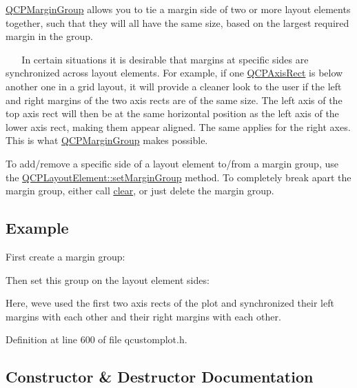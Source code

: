 \hyperlink{class_q_c_p_margin_group}{Q\+C\+P\+Margin\+Group} allows you to tie a margin side of two or more layout elements together, such that they will all have the same size, based on the largest required margin in the group.

~\newline
~\newline
 In certain situations it is desirable that margins at specific sides are synchronized across layout elements. For example, if one \hyperlink{class_q_c_p_axis_rect}{Q\+C\+P\+Axis\+Rect} is below another one in a grid layout, it will provide a cleaner look to the user if the left and right margins of the two axis rects are of the same size. The left axis of the top axis rect will then be at the same horizontal position as the left axis of the lower axis rect, making them appear aligned. The same applies for the right axes. This is what \hyperlink{class_q_c_p_margin_group}{Q\+C\+P\+Margin\+Group} makes possible.

To add/remove a specific side of a layout element to/from a margin group, use the \hyperlink{class_q_c_p_layout_element_a516e56f76b6bc100e8e71d329866847d}{Q\+C\+P\+Layout\+Element\+::set\+Margin\+Group} method. To completely break apart the margin group, either call \hyperlink{class_q_c_p_margin_group_a144b67f216e4e86c3a3a309e850285fe}{clear}, or just delete the margin group.\hypertarget{class_q_c_p_margin_group_QCPMarginGroup-example}{}\subsection{Example}\label{class_q_c_p_margin_group_QCPMarginGroup-example}
First create a margin group\+: 
\begin{DoxyCodeInclude}
\end{DoxyCodeInclude}
Then set this group on the layout element sides\+: 
\begin{DoxyCodeInclude}
\end{DoxyCodeInclude}
Here, we\textquotesingle{}ve used the first two axis rects of the plot and synchronized their left margins with each other and their right margins with each other. 

Definition at line 600 of file qcustomplot.\+h.



\subsection{Constructor \& Destructor Documentation}
\hypertarget{class_q_c_p_margin_group_ac481c20678ec5b305d6df330715f4b7b}{}
